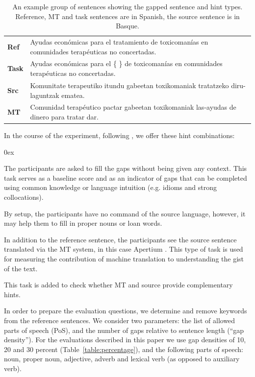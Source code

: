 \documentclass[11pt]{article}
\begin{document}
\begin{table}
  \centering
  \begin{tabular}{|l|l|}
     \hline
     \textbf{Ref}  & Ayudas econ\'{o}micas para el tratamiento de toxicoman\'{i}as en comunidades terap\'{e}uticas no concertadas. \\
     \textbf{Task} & Ayudas econ\'{o}micas para el \{ \} de toxicoman\'{i}as en comunidades terap\'{e}uticas no concertadas. \\
     \textbf{Src}  & Komunitate terapeutiko itundu gabeetan toxikomaniak tratatzeko diru-laguntzak ematea. \\
     \textbf{MT}   & Comunidad terap\'{e}utico pactar gabeetan toxikomaniak las-ayudas de dinero para tratar dar. \\
     \hline
  \end{tabular}
  \caption{An example group of sentences showing the gapped sentence and hint types. Reference, MT and task sentences are in Spanish, the source sentence is in Basque.} 
  \label{table:example}
\end{table}




In the course of the experiment, following \cite{oregan13}, we offer these hint combinations:
\begin{description}\itemsep 0ex
\item[Reference sentence only:] The participants are asked to fill the gaps without being given
any context. This task serves as a baseline score and as an indicator of gaps
that can be completed using common knowledge or language intuition (e.g.
idioms and strong collocations).
\item[Reference sentence and source sentence:] By setup, the
participants have no command of the source language, however, it may help them to fill
in proper nouns or loan words.
\item[Reference sentence and MT hint:] In addition to the reference sentence, the
participants see the source sentence translated via the MT system, in this case Apertium \citep{forcada11}. This type of task is
used for measuring the contribution of machine translation to understanding the
gist of the text.
\item[Reference sentence and both hints:] This task is
added to check whether MT and source provide complementary hints.
\end{description}

In order to prepare the evaluation questions, we determine and remove keywords from the 
reference sentences. We consider two parameters: the list of allowed parts of speech (PoS), and the 
number of gaps relative to sentence length (``gap density''). For the evaluations described in 
this paper we use gap densities of 10, 20 and 30 percent (Table~\ref{table:percentage}), and the following parts of speech: noun, 
proper noun, adjective, adverb and lexical verb (as opposed to auxiliary verb).
\end{document}
